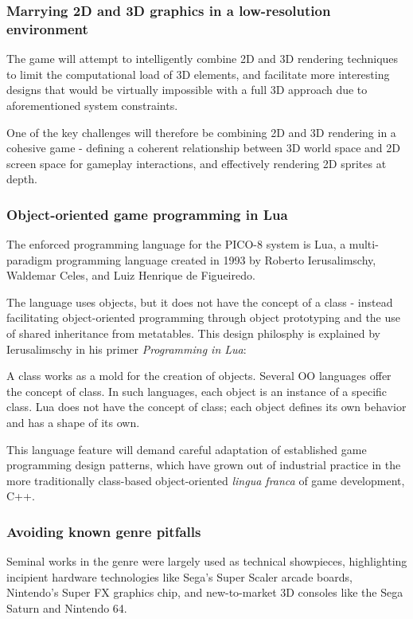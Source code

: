 \documentclass{article}
\begin{document}
\subsubsection*{Marrying 2D and 3D graphics in a low-resolution environment}
The game will attempt to intelligently combine 2D and 3D rendering techniques to limit
the computational load of 3D elements, and facilitate more interesting designs that would
be virtually impossible with a full 3D approach due to aforementioned system constraints.

One of the key challenges will therefore be combining 2D and 3D rendering in a cohesive game - 
defining a coherent relationship between 3D world space and 2D screen space for
gameplay interactions, and effectively rendering 2D sprites at depth.

\subsubsection*{Object-oriented game programming in Lua}
The enforced programming language for the PICO-8 system is Lua, a multi-paradigm programming
language created in 1993 by Roberto Ierusalimschy, Waldemar Celes, and Luiz Henrique de Figueiredo.

The language uses objects, but it does not have the concept of a class - instead facilitating
object-oriented programming through object prototyping and the use of shared inheritance
from metatables.\cite{ierusalimschy} This design philosphy is explained by Ierusalimschy in his
primer \textit{Programming in Lua}:

\begin{displayquote}
A class works as a mold for the creation of objects. Several OO languages offer the concept of class. In such languages, each object is an instance of a specific class. Lua does not have the concept of class; each object defines its own behavior and has a shape of its own.
\end{displayquote}

This language feature will demand careful adaptation of established game programming design
patterns, which have grown out of industrial practice in the more traditionally class-based
object-oriented \textit{lingua franca} of game development, C++.\cite{nystrom}

\subsubsection*{Avoiding known genre pitfalls}
Seminal works in the genre were largely used as technical showpieces, highlighting incipient
hardware technologies like Sega's Super Scaler arcade boards, Nintendo's Super FX graphics chip, and
new-to-market 3D consoles like the Sega Saturn and Nintendo 64.
\end{document}
